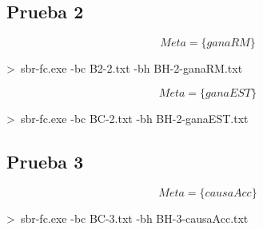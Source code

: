 \documentclass[a4paper,11pt, includehead]{article}
\begin{document}
\noindent
\begin{center}
	\begin{minipage}[t]{0.55\textwidth}
		
	\end{minipage}%
\end{center}

\clearpage

\subsection{Prueba 2}
$$Meta=\{ganaRM\}$$
\begin{center}
	\begin{tcolorbox}[simplecmd]
		>\ sbr-fc.exe -bc B2-2.txt -bh BH-2-ganaRM.txt
	\end{tcolorbox}
\end{center}

\noindent
\begin{center}
	\begin{minipage}[t]{0.55\textwidth}
		
	\end{minipage}%
\end{center}

\clearpage
$$Meta=\{ganaEST\}$$
\begin{center}
	\begin{tcolorbox}[simplecmd]
		>\ sbr-fc.exe -bc BC-2.txt -bh BH-2-ganaEST.txt
	\end{tcolorbox}
\end{center}
\noindent
\begin{center}
	\begin{minipage}[t]{0.55\textwidth}
		
	\end{minipage}%
\end{center}
\clearpage

\subsection{Prueba 3}
$$Meta=\{causaAcc\}$$
\begin{center}
	\begin{tcolorbox}[simplecmd]
		>\ sbr-fc.exe -bc BC-3.txt -bh BH-3-causaAcc.txt
	\end{tcolorbox}
\end{center}
\noindent
\begin{center}
	\begin{minipage}[t]{0.55\textwidth}
		
	\end{minipage}%
\end{center}
\clearpage
\end{document}
